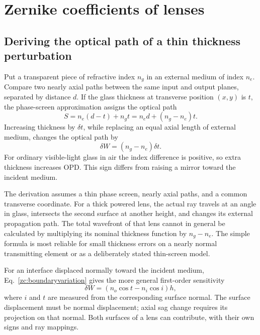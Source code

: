 \chapter{Zernike coefficients of lenses}
\label{zc:lenses}

\section{Deriving the optical path of a thin thickness perturbation}
Put a transparent piece of refractive index $n_g$ in an external medium
of index $n_e$. Compare two nearly axial paths between the same input
and output planes, separated by distance $d$. If the glass thickness
at transverse position $(x,y)$ is $t$, the phase-screen approximation
assigns the optical path
\begin{equation}
 S=n_e(d-t)+n_gt=n_ed+(n_g-n_e)t.
\end{equation}
Increasing thickness by $\delta t$, while replacing an equal axial
length of external medium, changes the optical path by
\begin{equation}
 \boxed{\delta W=(n_g-n_e)\delta t.}
 \label{zc:lensfactor}
\end{equation}
For ordinary visible-light glass in air the index difference is
positive, so extra thickness increases OPD. This sign differs from
raising a mirror toward the incident medium.

The derivation assumes a thin phase screen, nearly axial paths, and a
common transverse coordinate. For a thick powered lens, the actual ray
travels at an angle in glass, intersects the second surface at another
height, and changes its external propagation path. The total wavefront
of that lens cannot in general be calculated by multiplying its nominal
thickness function by $n_g-n_e$. The simple formula is most reliable
for small thickness errors on a nearly normal transmitting element or
as a deliberately stated thin-screen model.

For an interface displaced normally toward the incident medium,
Eq.~\eqref{zc:boundaryvariation} gives the more general first-order
sensitivity
\begin{equation}
 \delta W=(n_o\cos t-n_i\cos i)h,
 \label{zc:refractiveheight}
\end{equation}
where $i$ and $t$ are measured from the corresponding surface normal.
The surface displacement must be normal displacement; axial sag change
requires its projection on that normal. Both surfaces of a lens can
contribute, with their own signs and ray mappings.

